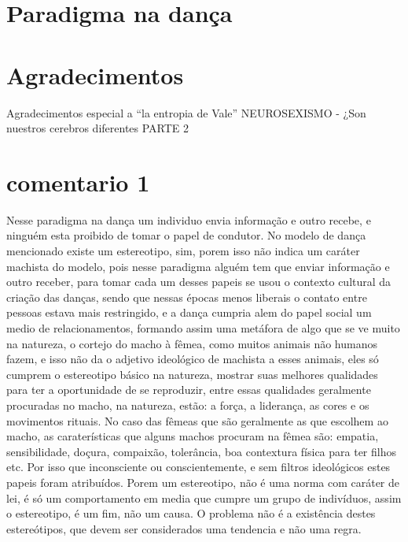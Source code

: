 \documentclass[a4paper,10pt]{article}
\begin{document}
\section{Paradigma na dança}


\section{Agradecimentos}
Agradecimentos especial a ``la entropia de Vale'' 
NEUROSEXISMO - ¿Son nuestros cerebros diferentes PARTE 2

\section{comentario 1}
Nesse paradigma na dança um individuo envia informação e outro recebe, e ninguém esta proibido de tomar o papel de condutor. No modelo de dança mencionado existe um estereotipo, sim, porem isso não indica um caráter machista do modelo, pois nesse paradigma alguém tem que enviar informação e outro receber, para tomar cada um desses papeis se usou o contexto cultural da criação das danças, sendo que nessas épocas menos liberais o contato entre pessoas estava mais restringido, e a dança cumpria alem do papel social um medio de relacionamentos, formando assim uma metáfora de algo que se ve muito na natureza, o cortejo do macho à fêmea, como muitos animais não humanos fazem, e isso não da o adjetivo ideológico de machista a esses animais, eles só cumprem o estereotipo básico na natureza, mostrar suas melhores qualidades para ter a oportunidade de se reproduzir, entre essas qualidades geralmente procuradas no macho, na natureza, estão: a força, a liderança, as cores e os movimentos rituais. No caso das fêmeas que são geralmente as que escolhem ao macho, as caraterísticas que alguns machos procuram na fêmea são: empatia, sensibilidade, doçura, compaixão, tolerância, boa contextura física para ter filhos etc. Por isso que inconsciente ou conscientemente, e sem filtros ideológicos estes papeis foram atribuídos. Porem um estereotipo, não é uma norma com caráter de lei, é só um comportamento em media que cumpre um grupo de indivíduos, assim o estereotipo, é um fim, não um causa. O problema não é a existência destes estereótipos, que devem ser considerados uma tendencia e não uma regra.﻿
\end{document}
